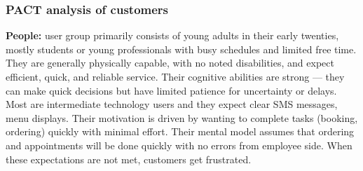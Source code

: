 \documentclass[]{VUMIFTemplateClass}
\newcommand{\todocomment}[1]{%
    \begin{tcolorbox}[colback=red!20, colframe=red!60, arc=0pt, outer arc=0pt, boxrule=1pt, left=3pt, right=3pt, top=3pt, bottom=3pt]
        \textbf{\textcolor{orange!70!black}{TODO:}} #1
    \end{tcolorbox}
}
\newcommand{\subsubsubsection}[1]{\paragraph{#1}}
\begin{document}



\subsubsection{PACT analysis of customers}

\textbf{People:} user group primarily consists of young adults in their early twenties, mostly students or young professionals with busy schedules and limited free time. They are generally physically capable, with no noted disabilities, and expect efficient, quick, and reliable service. Their cognitive abilities are strong — they can make quick decisions but have limited patience for uncertainty or delays. Most are intermediate technology users and they expect clear SMS messages, menu displays. Their motivation is driven by wanting to complete tasks (booking, ordering) quickly with minimal effort. Their mental model assumes that ordering and appointments will be done quickly with no errors from employee side. When these expectations are not met, customers get frustrated.
\end{document}
